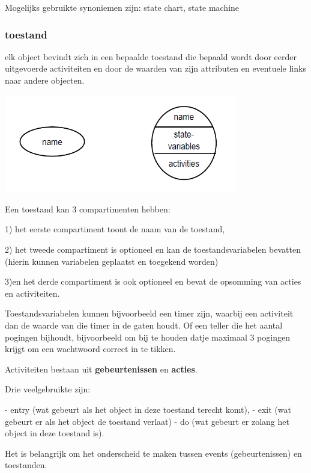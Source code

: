 Mogelijks gebruikte synoniemen zijn: state chart, state machine


\subsubsection{toestand}

elk object bevindt zich in een bepaalde toestand die bepaald wordt door eerder uitgevoerde activiteiten en door de waarden van zijn attributen en eventuele links naar andere objecten.


\begin{center}
\includegraphics[width=4in]{img/state2}%
\end{center}

Een toestand kan 3 compartimenten hebben:

1) het eerste compartiment toont de naam van de toestand, 

2) het tweede compartiment is optioneel en kan de toestandsvariabelen bevatten (hierin kunnen variabelen geplaatst en toegekend worden) 

3)en het derde compartiment is ook optioneel en bevat de opsomming van acties en activiteiten.

Toestandsvariabelen kunnen bijvoorbeeld een timer zijn, waarbij een activiteit dan de waarde van die timer in de gaten houdt. Of een teller die het aantal pogingen bijhoudt, bijvoorbeeld om bij te houden datje maximaal 3 pogingen krijgt om een wachtwoord correct in te tikken.

Activiteiten bestaan uit \textbf{gebeurtenissen} en \textbf{acties}. 

Drie veelgebruikte zijn: 

- entry (wat gebeurt als het object in deze toestand terecht komt), 
- exit (wat gebeurt er als het object de toestand verlaat) 
- do (wat gebeurt er zolang het object in deze toestand is).

Het is belangrijk om het onderscheid te maken tussen events (gebeurtenissen) en toestanden. 

